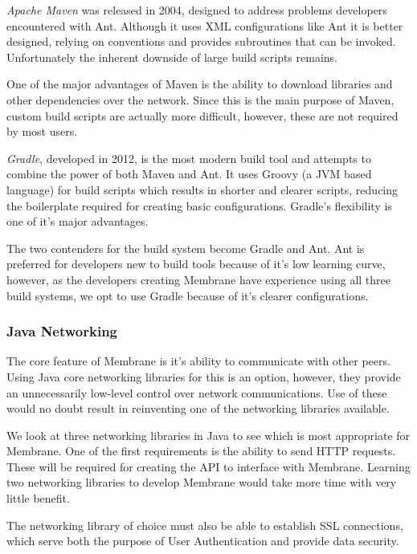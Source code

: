 \documentclass[11pt, a4paper, twoside]{report}
\begin{document}
\emph{Apache Maven} was released in 2004, designed to address problems developers encountered with Ant. Although it uses XML configurations like Ant it is better designed, relying on conventions and provides subroutines that can be invoked. Unfortunately the inherent downside of large build scripts remains.

One of the major advantages of Maven is the ability to download libraries and other dependencies over the network. Since this is the main purpose of Maven, custom build scripts are actually more difficult, however, these are not required by most users. \citep{viktor2014buildtools}

\emph{Gradle}, developed in 2012, is the most modern build tool and attempts to combine the power of both Maven and Ant. It uses Groovy (a JVM based language) for build scripts which results in shorter and clearer scripts, reducing the boilerplate required for creating basic configurations. \citep{gradle2017comparison} Gradle's flexibility is one of it's major advantages. \citep{casperson2014comparison}

The two contenders for the build system become Gradle and Ant. Ant is preferred for developers new to build tools because of it's low learning curve, however, as the developers creating Membrane have experience using all three build systems, we opt to use Gradle because of it's clearer configurations.

\subsubsection{Java Networking}

The core feature of Membrane is it's ability to communicate with other peers. Using Java core networking libraries for this is an option, however, they provide an unnecessarily  low-level control over network communications. Use of these would no doubt result in reinventing one of the networking libraries available.

We look at three networking libraries in Java to see which is most appropriate for Membrane. One of the first requirements is the ability to send HTTP requests. These will be required for creating the API to interface with Membrane. Learning two networking libraries to develop Membrane would take more time with very little benefit.

The networking library of choice must also be able to establish SSL connections, which serve both the purpose of User Authentication and provide data security.
\end{document}
